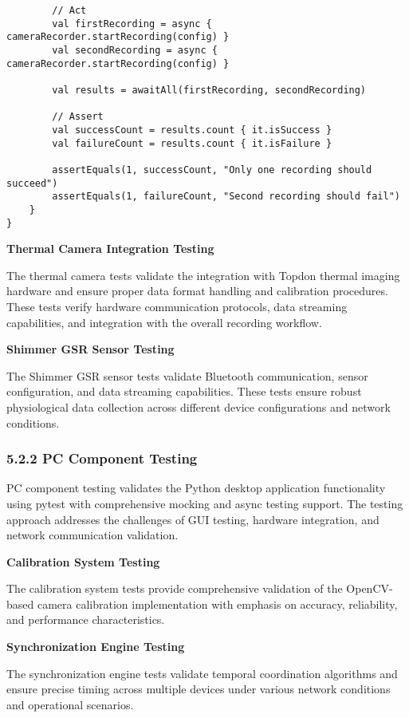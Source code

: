 \documentclass[12pt,a4paper]{article}
\begin{document}
\begin{verbatim}
        // Act
        val firstRecording = async { cameraRecorder.startRecording(config) }
        val secondRecording = async { cameraRecorder.startRecording(config) }
        
        val results = awaitAll(firstRecording, secondRecording)
        
        // Assert
        val successCount = results.count { it.isSuccess }
        val failureCount = results.count { it.isFailure }
        
        assertEquals(1, successCount, "Only one recording should succeed")
        assertEquals(1, failureCount, "Second recording should fail")
    }
}
\end{verbatim}

\textbf{Thermal Camera Integration Testing}

The thermal camera tests validate the integration with Topdon thermal imaging hardware and ensure proper data format
handling and calibration procedures. These tests verify hardware communication protocols, data streaming capabilities,
and integration with the overall recording workflow.

\textbf{Shimmer GSR Sensor Testing}

The Shimmer GSR sensor tests validate Bluetooth communication, sensor configuration, and data streaming capabilities.
These tests ensure robust physiological data collection across different device configurations and network conditions.

\subsubsection{5.2.2 PC Component Testing}

PC component testing validates the Python desktop application functionality using pytest with comprehensive mocking and
async testing support. The testing approach addresses the challenges of GUI testing, hardware integration, and network
communication validation.

\textbf{Calibration System Testing}

The calibration system tests provide comprehensive validation of the OpenCV-based camera calibration implementation with
emphasis on accuracy, reliability, and performance characteristics.

\textbf{Synchronization Engine Testing}

The synchronization engine tests validate temporal coordination algorithms and ensure precise timing across multiple
devices under various network conditions and operational scenarios.
\end{document}
